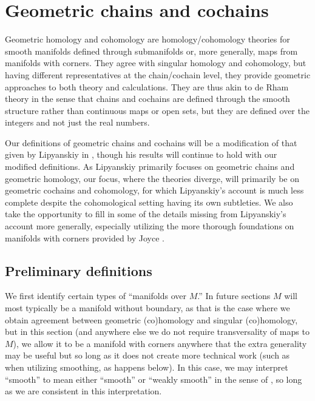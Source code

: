 
\section{Geometric chains and cochains} \label{S: geometric cochains}

Geometric homology and cohomology are homology/cohomology theories for smooth manifolds defined through submanifolds or, more generally, maps from  manifolds with corners.
They agree with singular homology and cohomology, but having different representatives
at the chain/cochain level, they provide geometric approaches to both theory and calculations.
They are thus akin to de Rham theory in the sense that chains and cochains are defined through the smooth structure rather than continuous maps or open sets,
but they are defined over the integers and not just the real numbers.

Our definitions of geometric chains and cochains will be a modification of that given by Lipyanskiy in \cite{Lipy14}, though his results will continue to hold with our modified definitions. As Lipyanskiy primarily focuses on geometric chains and geometric homology, our focus, where the theories diverge, will primarily be on geometric cochains and cohomology, for which Lipyanskiy's account is much less complete despite the cohomological setting having its own subtleties. We also take the opportunity to fill in some of the details missing from Lipyanskiy's account more generally, especially utilizing the more thorough foundations on manifolds with corners provided by Joyce \cite{Joy12}.

\subsection{Preliminary definitions}

We first identify certain types of ``manifolds over $M$.'' In future sections $M$ will most typically be a manifold without boundary, as that is the case where we obtain agreement between geometric (co)homology and singular (co)homology, but in this section (and anywhere else we do not require transversality of maps to $M$), we allow it to be a manifold with corners anywhere that the extra generality may be useful but so long as it does not create more  technical work (such as when utilizing smoothing, as happens below). In this case, we may interpret ``smooth'' to mean either ``smooth'' or ``weakly smooth'' in the sense of \cite{Joy12}, so long as we are consistent in this interpretation.

